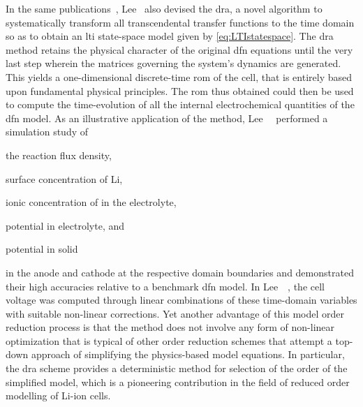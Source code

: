 In the  same publications~\cite{Lee2012a,Lee2012}, Lee~\etal{} also  devised the
\gls{dra},  a novel  algorithm  to systematically  transform all  transcendental
transfer functions to  the time domain so as to  obtain an \gls{lti} state-space
model  given  by  \cref{eq:LTIstatespace}.  The  \gls{dra}  method  retains  the
physical character of the original \gls{dfn}  equations until the very last step
wherein the matrices governing the  system's dynamics are generated. This yields
a one-dimensional  discrete-time \gls{rom} of  the cell, that is  entirely based
upon fundamental  physical principles.  The \gls{rom}  thus obtained  could then
be  used to  compute  the  time-evolution of  all  the internal  electrochemical
quantities of the \gls{dfn} model. As an illustrative application of the method,
Lee~\etal~\cite{Lee2012a}  performed a simulation study of
\begin{enumerate*}[label=\itshape\alph*\upshape)]
    \item the reaction flux density,
    \item surface concentration of Li,
    \item ionic concentration of  in the electrolyte,
    \item potential in electrolyte, and
    \item potential in solid
\end{enumerate*}
in   the  anode   and  cathode   at   the  respective   domain  boundaries   and
demonstrated  their high  accuracies relative  to a  benchmark \gls{dfn}  model.
In  Lee~\etal~\cite{Lee2012,Lee2012a}, the  cell  voltage  was computed  through
linear  combinations of  these  time-domain variables  with suitable  non-linear
corrections. Yet another advantage of this model order reduction process is that
the method does not involve any  form of non-linear optimization that is typical
of other order reduction schemes that attempt a top-down approach of simplifying
the physics-based model equations. In  particular, the \gls{dra} scheme provides
a deterministic method for selection of the order of the simplified model, which
is a pioneering  contribution in the field of reduced  order modelling of Li-ion
cells.


